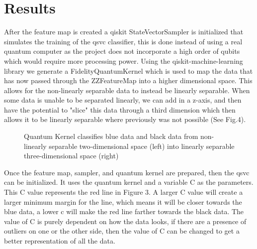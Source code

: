 \documentclass{article}
\begin{document}
\section{Results}
After the feature map is created a qiskit StateVectorSampler is initialized that simulates the training of the \gls{qsvc} classifier, this is done instead of using a real quantum computer as the project does not incorporate a high order of qubits which would require more processing power. Using the qiskit-machine-learning library we generate a FidelityQuantumKernel which is used to map the data that has now passed through the ZZFeatureMap into a higher dimensional space. This allows for the non-linearly separable data to instead be linearly separable. When some data is unable to be separated linearly, we can add in a z-axis, and then have the potential to "slice" this data through a third dimension which then allows it to be linearly separable where previously was not possible (See Fig.4). 
\begin{figure}[H]
    \centering
    \caption{Quantum Kernel classifies blue data and black data from non-linearly separable two-dimensional space (left) into linearly separable three-dimensional space (right)}
    \label{fig:4}
\end{figure}
\noindent
Once the feature map, sampler, and quantum kernel are prepared, then the \gls{qsvc} can be initialized. It uses the quantum kernel and a variable C as the parameters. This C value represents the red line in Figure 3. A larger C value will create a larger minimum margin for the line, which means it will be closer towards the blue data, a lower c will make the red line farther towards the black data. The value of C is purely dependent on how the data looks, if there are a presence of outliers on one or the other side, then the value of C can be changed to get a better representation of all the data. 
\end{document}
